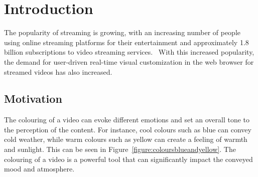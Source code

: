 \documentclass[../MasterThesis.tex]{subfiles}
\begin{document}
	\newpage
	\section{Introduction} \label{section:introduction}
	
	
	The popularity of streaming is growing, with an increasing number of people using online streaming platforms for their entertainment and approximately 1.8 billion subscriptions to video streaming services.~\cite{nielsen, stats}
	With this increased popularity, the demand for user-driven real-time visual customization in the web browser for streamed videos has also increased.
	
	
	
	
	
	
	
	
	
	
	
	
	
	
	
	
	
	
	\subsection{Motivation} \label{subsection:motivation}
	
	
	The colouring of a video can evoke different emotions and set an overall tone to the perception of the content. For instance, cool colours such as blue can convey cold weather, while warm colours such as yellow can create a feeling of warmth and sunlight. This can be seen in Figure~\ref{figure:coloursblueandyellow}.
	The colouring of a video is a powerful tool that can significantly impact the conveyed mood and atmosphere.~\cite{colorgrading1, colorgrading2}
	
	
\end{document}
